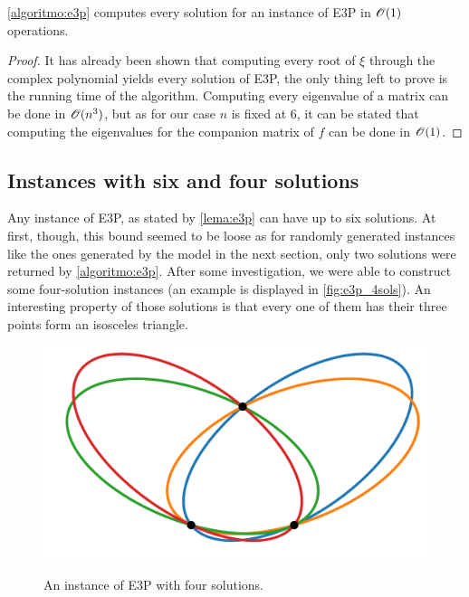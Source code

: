 \begin{teorema}\label{th:e3p}
	\autoref{algoritmo:e3p} computes every solution for an instance of E3P in $\mathscr{O}(1)$ operations.
\end{teorema}

\begin{proof}
	It has already been shown that computing every root of $\xi$ through the complex polynomial yields every solution of E3P, the only thing left to prove is the running time of the algorithm.
	Computing every eigenvalue of a matrix can be done in $\mathscr{O}(n^3)$, but as for our case $n$ is fixed at $6$, it can be stated that computing the eigenvalues for the companion matrix of $f$ can be done in $\mathscr{O}(1)$.
\end{proof}

\subsection{Instances with six and four solutions}

Any instance of E3P, as stated by \autoref{lema:e3p} can have up to six solutions. At first, though, this bound seemed to be loose as for randomly generated instances like the ones generated by the model in the next section, only two solutions were returned by \autoref{algoritmo:e3p}.
After some investigation, we were able to construct some four-solution instances (an example is displayed in \autoref{fig:e3p_4sols}). An interesting property of those solutions is that every one of them has their three points form an isosceles triangle.

\begin{figure}
	\centering
	\caption{An instance of E3P with four solutions.}
	\includegraphics[scale=.35]{tex/figures/e3p_4sols}
	\fautor
	\label{fig:e3p_4sols}
\end{figure}

